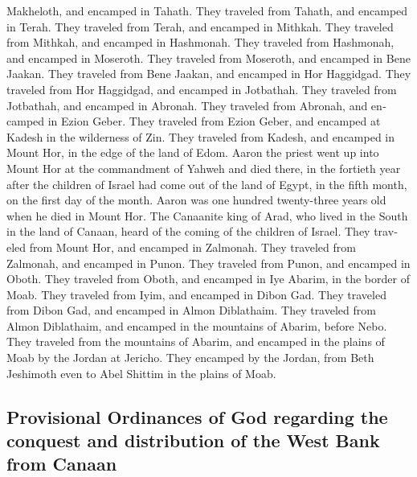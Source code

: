\begin{paracol}{2}
\begin{otherlanguage}{english}
Makheloth, and encamped in Tahath.  They traveled from
Tahath, and encamped in Terah.  They traveled from Terah,
and encamped in Mithkah.  They traveled from Mithkah, and
encamped in Hashmonah.  They traveled from Hashmonah, and
encamped in Moseroth.  They traveled from Moseroth, and
encamped in Bene Jaakan.  They traveled from Bene Jaakan,
and encamped in Hor Haggidgad.  They traveled from Hor
Haggidgad, and encamped in Jotbathah.  They traveled from
Jotbathah, and encamped in Abronah.  They traveled from
Abronah, and encamped in Ezion Geber.  They traveled from
Ezion Geber, and encamped at Kadesh in the wilderness of Zin.
 They traveled from Kadesh, and encamped in Mount Hor, in
the edge of the land of Edom.  Aaron the priest went up
into Mount Hor at the commandment of Yahweh and died there, in the
fortieth year after the children of Israel had come out of the land of
Egypt, in the fifth month, on the first day of the month.
 Aaron was one hundred twenty-three years old when he
died in Mount Hor.  The Canaanite king of Arad, who lived
in the South in the land of Canaan, heard of the coming of the children
of Israel.  They traveled from Mount Hor, and encamped in
Zalmonah.  They traveled from Zalmonah, and encamped in
Punon.  They traveled from Punon, and encamped in Oboth.
 They traveled from Oboth, and encamped in Iye Abarim, in
the border of Moab.  They traveled from Iyim, and
encamped in Dibon Gad.  They traveled from Dibon Gad, and
encamped in Almon Diblathaim.  They traveled from Almon
Diblathaim, and encamped in the mountains of Abarim, before Nebo.
 They traveled from the mountains of Abarim, and encamped
in the plains of Moab by the Jordan at Jericho.  They
encamped by the Jordan, from Beth Jeshimoth even to Abel Shittim in the
plains of Moab.

\hypertarget{provisional-ordinances-of-god-regarding-the-conquest-and-distribution-of-the-west-bank-from-canaan}{%
\subsection{Provisional Ordinances of God regarding the conquest and
distribution of the West Bank from
Canaan}\label{provisional-ordinances-of-god-regarding-the-conquest-and-distribution-of-the-west-bank-from-canaan}}


\end{otherlanguage}
\end{paracol}
